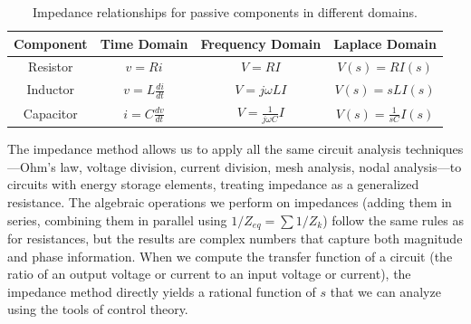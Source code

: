 \begin{table}[htbp]
\centering
\color{UofSCBlack}
\begin{tabular}{|c|c|c|c|}
\hline
\color{UofSCGarnet}\textbf{Component} & \color{UofSCGarnet}\textbf{Time Domain} & \color{UofSCGarnet}\textbf{Frequency Domain} & \color{UofSCGarnet}\textbf{Laplace Domain} \\
\hline
Resistor & $v = Ri$ & $V = RI$ & $V(s) = RI(s)$ \\
\hline
Inductor & $v = L \frac{di}{dt}$ & $V = j\omega L I$ & $V(s) = sL I(s)$ \\
\hline
Capacitor & $i = C \frac{dv}{dt}$ & $V = \frac{1}{j\omega C} I$ & $V(s) = \frac{1}{sC} I(s)$ \\
\hline
\end{tabular}
\color{UofSCBlack}
\captionsetup{justification=centering}
\caption{Impedance relationships for passive components in different domains.}
\end{table}

The impedance method allows us to apply all the same circuit analysis techniques—Ohm's law, voltage division, current division, mesh analysis, nodal analysis—to circuits with energy storage elements, treating impedance as a generalized resistance. The algebraic operations we perform on impedances (adding them in series, combining them in parallel using $1/Z_{eq} = \sum 1/Z_k$) follow the same rules as for resistances, but the results are complex numbers that capture both magnitude and phase information. When we compute the transfer function of a circuit (the ratio of an output voltage or current to an input voltage or current), the impedance method directly yields a rational function of $s$ that we can analyze using the tools of control theory.

